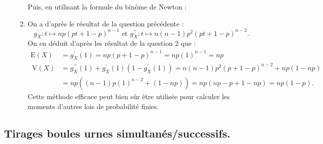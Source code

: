 \begin{correction}
\begin{enumerate}
\begin{enumerate}
Puis,  en utilisant la formule du binôme de Newton :
\item On a d'après le résultat de la question précédente :
$$
g_{X}^{\prime}: t \mapsto n p(p t+1-p)^{n-1} \text { et } g_{X}^{\prime \prime}: t \mapsto n(n-1) p^{2}(p t+1-p)^{n-2} .
$$
On en déduit d'après les résultat de la question 2 que :
$$
\begin{aligned}
\mathrm{E}(X) &=g_{X}^{\prime}(1)=n p(p+1-p)^{n-1}=n p(1)^{n-1}=n p \\
\mathrm{~V}(X) &=g_{X}^{\prime \prime}(1)+g_{X}^{\prime}(1)\left(1-g_{X}^{\prime}(1)\right)=n(n-1) p^{2}(p+1-p)^{n-2}+n p(1-n p) \\
&=n p\left((n-1) p(1)^{n-2}+(1-n p)\right)=n p(n p-p+1-n p)=n p(1-p) .
\end{aligned}
$$
Cette méthode efficace peut bien sûr être utilisée pour calculer les moments d'autres lois de probabilité finies.

\end{enumerate}
\end{enumerate}





\end{correction}



\subsection{Tirages boules urnes simultanés/successifs. }


